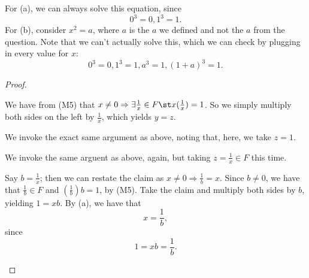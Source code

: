 \documentclass{assignment}
\begin{document}
\begin{qparts}
\item 
    For (a), we can always solve this equation, since $$0^3 = 0, 1^3 = 1.$$ 
    For (b), consider $x^2 = a$, where $a$ is the $a$ we defined and not the $a$ from the question. Note that
    we can't actually solve this, which we can check by plugging in every value for $x$: $$0^3 = 0,
    1^3 = 1, a^3 = 1, (1+a)^3 = 1.$$
\end{qparts}



\begin{proof}
  \vspace{1em}
  \begin{qparts}
  \item We have from (M5) that $x\neq 0 \Rightarrow \exists \frac{1}{x}\in F \st x(\frac{1}{x}) = 1$.
    So we simply multiply both sides on the left by $\frac{1}{x}$, which yields $y=z$.
  \item We invoke the exact same argument as above, noting that, here, we take $z=1$.
  \item We invoke the same arguent as above, again, but taking $z=\frac{1}{x}\in F$ this time.
  \item Say $b = \frac{1}{x}$; then we can restate the claim as $x\neq 0 \Rightarrow \frac{1}{b} = x$.
    Since $b\neq 0$, we have that $\frac{1}{b}\in F$ and $(\frac{1}{b})b = 1$, by (M5). Take the claim and multiply
    both sides by $b$, yielding $1 = xb$. By (a), we have that $$x = \frac{1}{b},$$ since $$1 = xb = \frac{1}{b}.$$
  \end{qparts}
\end{proof}
\end{document}
